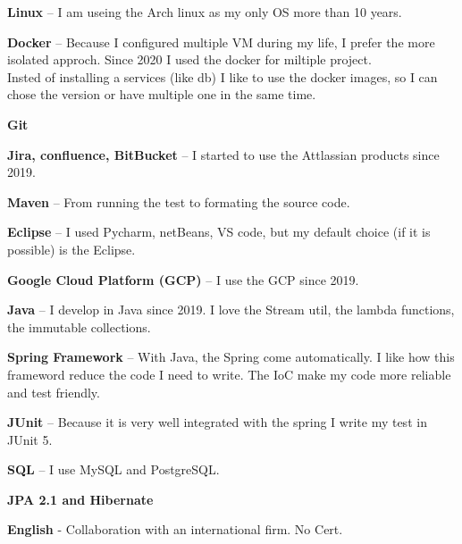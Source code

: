 \documentclass[9pt]{developercv} %
\begin{document}

\begin{minipage}[t]{0.48\textwidth}
	\vspace{-\baselineskip} %


	\textbf{Linux} --
	I am useing the Arch linux as my only OS more than 10 years.

	\textbf{Docker} -- 
	Because I configured multiple VM during my life,
	I prefer the more isolated approch. Since 2020 I used the docker for miltiple project. \\
	Insted of installing a services (like db) I like to use the docker images, so I can chose the version or have multiple one in the same time.

	\textbf{Git}

	\textbf{Jira, confluence, BitBucket} --
	I started to use the Attlassian products since 2019.

	\textbf{Maven} -- From running the test to formating the source code.

	\textbf{Eclipse} --
	I used Pycharm, netBeans, VS code, but my default choice (if it is possible) is the Eclipse.

	\textbf{Google Cloud Platform (GCP)} --
	I use the GCP since 2019.

\end{minipage}
\hfill
\begin{minipage}[t]{0.5\textwidth}
	\vspace{-\baselineskip} %
	
	
	\textbf{Java} -- I develop in Java since 2019. I love the Stream util, the lambda functions, the immutable collections.
	
	\textbf{Spring Framework} -- With Java, the Spring come automatically. I like how this frameword reduce the code I need to write. The IoC make my code more reliable and test friendly.

	\textbf{JUnit} -- Because it is very well integrated with the spring I write my test in JUnit 5.
	
	\textbf{SQL} -- I use MySQL and PostgreSQL.

	\textbf{JPA 2.1 and Hibernate}
	

	
	\textbf{English} - Collaboration with an international firm. No Cert.
 

\end{minipage}

\end{document}
